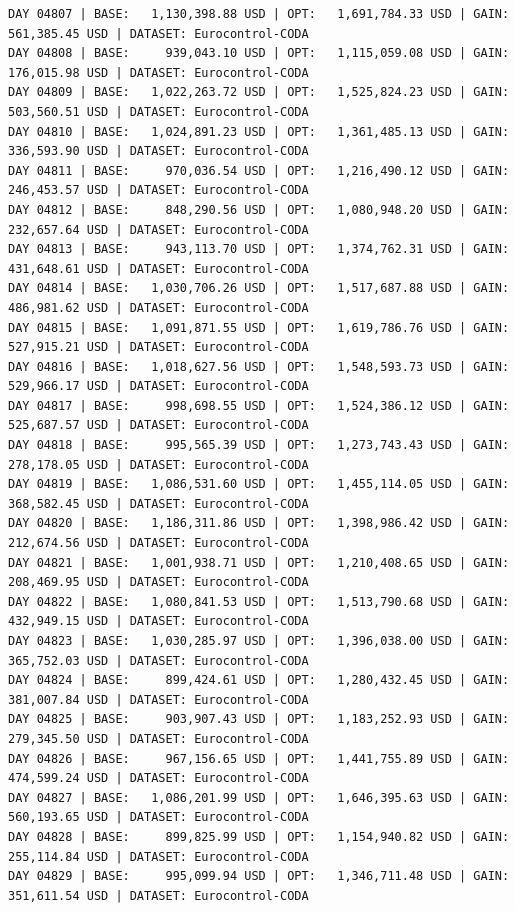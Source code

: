 \documentclass[11pt,a4paper]{article}
\begin{document}
\begin{verbatim}
DAY 04807 | BASE:   1,130,398.88 USD | OPT:   1,691,784.33 USD | GAIN: 561,385.45 USD | DATASET: Eurocontrol-CODA
DAY 04808 | BASE:     939,043.10 USD | OPT:   1,115,059.08 USD | GAIN: 176,015.98 USD | DATASET: Eurocontrol-CODA
DAY 04809 | BASE:   1,022,263.72 USD | OPT:   1,525,824.23 USD | GAIN: 503,560.51 USD | DATASET: Eurocontrol-CODA
DAY 04810 | BASE:   1,024,891.23 USD | OPT:   1,361,485.13 USD | GAIN: 336,593.90 USD | DATASET: Eurocontrol-CODA
DAY 04811 | BASE:     970,036.54 USD | OPT:   1,216,490.12 USD | GAIN: 246,453.57 USD | DATASET: Eurocontrol-CODA
DAY 04812 | BASE:     848,290.56 USD | OPT:   1,080,948.20 USD | GAIN: 232,657.64 USD | DATASET: Eurocontrol-CODA
DAY 04813 | BASE:     943,113.70 USD | OPT:   1,374,762.31 USD | GAIN: 431,648.61 USD | DATASET: Eurocontrol-CODA
DAY 04814 | BASE:   1,030,706.26 USD | OPT:   1,517,687.88 USD | GAIN: 486,981.62 USD | DATASET: Eurocontrol-CODA
DAY 04815 | BASE:   1,091,871.55 USD | OPT:   1,619,786.76 USD | GAIN: 527,915.21 USD | DATASET: Eurocontrol-CODA
DAY 04816 | BASE:   1,018,627.56 USD | OPT:   1,548,593.73 USD | GAIN: 529,966.17 USD | DATASET: Eurocontrol-CODA
DAY 04817 | BASE:     998,698.55 USD | OPT:   1,524,386.12 USD | GAIN: 525,687.57 USD | DATASET: Eurocontrol-CODA
DAY 04818 | BASE:     995,565.39 USD | OPT:   1,273,743.43 USD | GAIN: 278,178.05 USD | DATASET: Eurocontrol-CODA
DAY 04819 | BASE:   1,086,531.60 USD | OPT:   1,455,114.05 USD | GAIN: 368,582.45 USD | DATASET: Eurocontrol-CODA
DAY 04820 | BASE:   1,186,311.86 USD | OPT:   1,398,986.42 USD | GAIN: 212,674.56 USD | DATASET: Eurocontrol-CODA
DAY 04821 | BASE:   1,001,938.71 USD | OPT:   1,210,408.65 USD | GAIN: 208,469.95 USD | DATASET: Eurocontrol-CODA
DAY 04822 | BASE:   1,080,841.53 USD | OPT:   1,513,790.68 USD | GAIN: 432,949.15 USD | DATASET: Eurocontrol-CODA
DAY 04823 | BASE:   1,030,285.97 USD | OPT:   1,396,038.00 USD | GAIN: 365,752.03 USD | DATASET: Eurocontrol-CODA
DAY 04824 | BASE:     899,424.61 USD | OPT:   1,280,432.45 USD | GAIN: 381,007.84 USD | DATASET: Eurocontrol-CODA
DAY 04825 | BASE:     903,907.43 USD | OPT:   1,183,252.93 USD | GAIN: 279,345.50 USD | DATASET: Eurocontrol-CODA
DAY 04826 | BASE:     967,156.65 USD | OPT:   1,441,755.89 USD | GAIN: 474,599.24 USD | DATASET: Eurocontrol-CODA
DAY 04827 | BASE:   1,086,201.99 USD | OPT:   1,646,395.63 USD | GAIN: 560,193.65 USD | DATASET: Eurocontrol-CODA
DAY 04828 | BASE:     899,825.99 USD | OPT:   1,154,940.82 USD | GAIN: 255,114.84 USD | DATASET: Eurocontrol-CODA
DAY 04829 | BASE:     995,099.94 USD | OPT:   1,346,711.48 USD | GAIN: 351,611.54 USD | DATASET: Eurocontrol-CODA

\end{verbatim}
\end{document}
